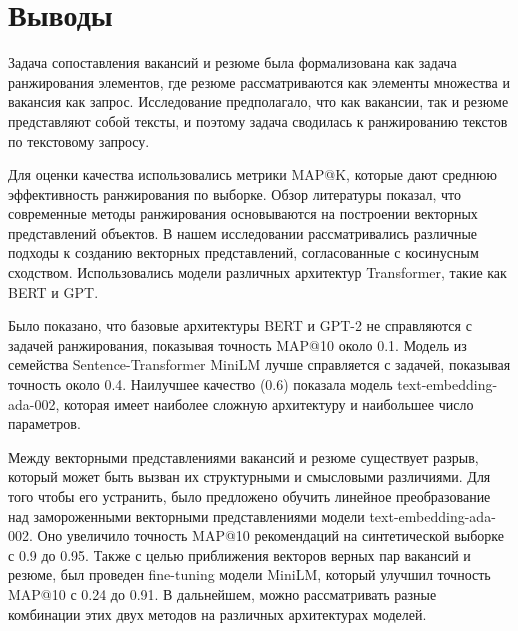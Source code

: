 \documentclass{article}
\begin{document}
\section{Выводы}

Задача сопоставления вакансий и резюме была формализована как задача ранжирования элементов, где резюме рассматриваются как элементы множества и вакансия как запрос. Исследование предполагало, что как вакансии, так и резюме представляют собой тексты, и поэтому задача сводилась к ранжированию текстов по текстовому запросу.

Для оценки качества использовались метрики MAP@K, которые дают среднюю эффективность ранжирования по выборке. Обзор литературы показал, что современные методы ранжирования основываются на построении векторных представлений объектов. В нашем исследовании рассматривались различные подходы к созданию векторных представлений, согласованные с косинусным сходством. Использовались модели различных архитектур Transformer, такие как BERT и GPT.

Было показано, что базовые архитектуры BERT и GPT-2 не справляются с задачей ранжирования, показывая точность MAP@10 около 0.1. Модель из семейства Sentence-Transformer MiniLM лучше справляется с задачей, показывая точность около 0.4. Наилучшее качество (0.6) показала модель text-embedding-ada-002, которая имеет наиболее сложную архитектуру и наибольшее число параметров.

Между векторными представлениями вакансий и резюме существует разрыв, который может быть вызван их структурными и смысловыми различиями. Для того чтобы его устранить, было предложено обучить линейное преобразование над замороженными векторными представлениями модели text-embedding-ada-002. Оно увеличило точность MAP@10 рекомендаций на синтетической выборке с 0.9 до 0.95. Также с целью приближения векторов верных пар вакансий и резюме, был проведен fine-tuning модели MiniLM, который улучшил точность MAP@10 с 0.24 до 0.91. В дальнейшем, можно рассматривать разные комбинации этих двух методов на различных архитектурах моделей. 



\end{document}
